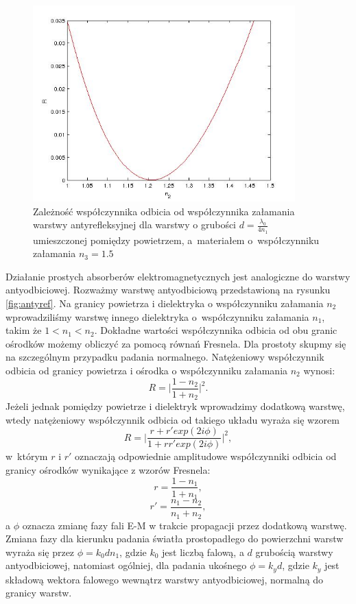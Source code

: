 \begin{figure}[htb]
	\centering
	\includegraphics[width=0.9\textwidth]{images/antyref.jpg}
	\caption{Zależność współczynnika odbicia od współczynnika załamania warstwy antyrefleksyjnej dla warstwy o grubości $d=\frac{\lambda_0}{4 n_1}$ umieszczonej pomiędzy powietrzem, a~materiałem o~współczynniku załamania $n_3=1.5$}
	\label{fig:antyref-result}
\end{figure}


Działanie prostych absorberów elektromagnetycznych jest analogiczne do warstwy antyodbiciowej. Rozważmy   warstwę antyodbiciową przedstawioną na rysunku \ref{fig:antyref}. Na granicy powietrza i dielektryka o współczynniku załamania $n_2$ wprowadziliśmy warstwę innego dielektryka o~współczynniku załamania $n_1$, takim że $1<n_1<n_2$. Dokładne wartości współczynnika odbicia od obu granic ośrodków możemy obliczyć za pomocą równań Fresnela. Dla prostoty skupmy się na szczególnym przypadku padania normalnego. Natężeniowy współczynnik odbicia od granicy powietrza i ośrodka o współczynniku załamania $n_2$ wynosi:
\begin{equation}
R=\bigg|\frac{1-n_2}{1+n_2}\bigg|^2.
\end{equation}
Jeżeli jednak pomiędzy powietrze i dielektryk wprowadzimy dodatkową warstwę, wtedy natężeniowy współczynnik odbicia od takiego układu wyraża się wzorem
\begin{equation}
R=\Bigg| \frac{r+r' exp(2 i\phi)}{1+r r' exp(2 i\phi)} \Bigg|^2,
\end{equation}
w~którym $r$ i $r'$ oznaczają odpowiednie amplitudowe współczynniki odbicia od granicy ośrodków wynikające z wzorów Fresnela:
\begin{equation}
r=\frac{1-n_1}{1+n_1},
\end{equation}
\begin{equation}
r'=\frac{n_1-n_2}{n_1+n_2},
\end{equation}
a $\phi$ oznacza zmianę fazy fali E-M w trakcie propagacji przez dodatkową warstwę. Zmiana fazy dla kierunku padania światła prostopadłego do powierzchni warstw wyraża się przez $\phi=k_0 d n_1$, gdzie $k_0$ jest liczbą falową, a $d$ grubością warstwy antyodbiciowej, natomiast ogólniej, dla padania ukośnego $\phi=k_y d$, gdzie $k_y$ jest składową wektora falowego wewnątrz warstwy antyodbiciowej, normalną do granicy warstw. 

